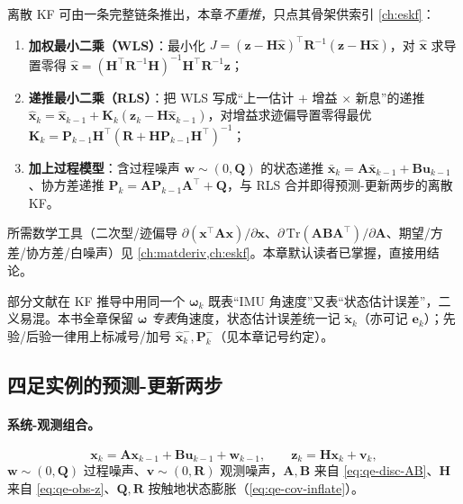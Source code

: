 \begin{derivation}\label{deriv:qe-kf-lineage}
离散 KF 可由一条完整链条推出，本章\emph{不重推}，只点其骨架供索引 \cref{ch:eskf}：
\begin{enumerate}
  \item \textbf{加权最小二乘（WLS）}：最小化 $J=(\boldsymbol z-\mathbf{H}\hat{\boldsymbol x})^\top\mathbf{R}^{-1}(\boldsymbol z-\mathbf{H}\hat{\boldsymbol x})$，对 $\hat{\boldsymbol x}$ 求导置零得 $\hat{\boldsymbol x}=(\mathbf{H}^\top\mathbf{R}^{-1}\mathbf{H})^{-1}\mathbf{H}^\top\mathbf{R}^{-1}\boldsymbol z$；
  \item \textbf{递推最小二乘（RLS）}：把 WLS 写成“上一估计 $+$ 增益 $\times$ 新息”的递推 $\hat{\boldsymbol x}_k=\hat{\boldsymbol x}_{k-1}+\mathbf{K}_k(\boldsymbol z_k-\mathbf{H}\hat{\boldsymbol x}_{k-1})$，对增益求迹偏导置零得最优 $\mathbf{K}_k=\mathbf{P}_{k-1}\mathbf{H}^\top(\mathbf{R}+\mathbf{H}\mathbf{P}_{k-1}\mathbf{H}^\top)^{-1}$；
  \item \textbf{加上过程模型}：含过程噪声 $\boldsymbol w\sim(0,\mathbf{Q})$ 的状态递推 $\bar{\boldsymbol x}_k=\mathbf{A}\bar{\boldsymbol x}_{k-1}+\mathbf{B}\boldsymbol u_{k-1}$、协方差递推 $\mathbf{P}_k=\mathbf{A}\mathbf{P}_{k-1}\mathbf{A}^\top+\mathbf{Q}$，与 RLS 合并即得预测-更新两步的离散 KF。
\end{enumerate}
所需数学工具（二次型/迹偏导 $\partial(\boldsymbol x^\top\mathbf{A}\boldsymbol x)/\partial\boldsymbol x$、$\partial\,\mathrm{Tr}(\mathbf{A}\mathbf{B}\mathbf{A}^\top)/\partial\mathbf{A}$、期望/方差/协方差/白噪声）见 \cref{ch:matderiv,ch:eskf}。本章默认读者已掌握，直接用结论。
\end{derivation}

\begin{note}\label{note:qe-ocr-symbol}
部分文献在 KF 推导中用同一个 $\boldsymbol\omega_k$ 既表“IMU 角速度”又表“状态估计误差”，二义易混。本书全章保留 $\boldsymbol\omega$ \emph{专表}角速度，状态估计误差统一记 $\tilde{\boldsymbol x}_k$（亦可记 $\boldsymbol e_k$）；先验/后验一律用上标减号/加号 $\hat{\boldsymbol x}_k^-,\mathbf{P}_k^-$（见本章记号约定）。
\end{note}

\subsection{四足实例的预测-更新两步}
\label{subsec:qe-kf-steps}

\paragraph{系统-观测组合。}
\begin{equation}
  \boldsymbol x_k = \mathbf{A}\boldsymbol x_{k-1} + \mathbf{B}\boldsymbol u_{k-1} + \boldsymbol w_{k-1},
  \qquad
  \boldsymbol z_k = \mathbf{H}\boldsymbol x_k + \boldsymbol v_k,
  \label{eq:qe-kf-system}
\end{equation}
$\boldsymbol w\sim(0,\mathbf{Q})$ 过程噪声、$\boldsymbol v\sim(0,\mathbf{R})$ 观测噪声，$\mathbf{A},\mathbf{B}$ 来自 \cref{eq:qe-disc-AB}、$\mathbf{H}$ 来自 \cref{eq:qe-obs-z}、$\mathbf{Q},\mathbf{R}$ 按触地状态膨胀（\cref{eq:qe-cov-inflate}）。

